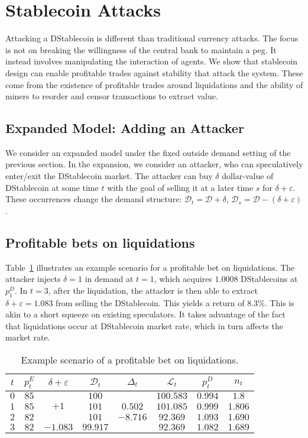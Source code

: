 \section{Stablecoin Attacks}\label{sec:attacks}

Attacking a DStablecoin is different than traditional currency attacks. The focus is not on breaking the willingness of the central bank to maintain a peg. It instead involves manipulating the interaction of agents. We show that stablecoin design can enable profitable trades against stability that attack the system. These come from the existence of profitable trades around liquidations and the ability of miners to reorder and censor transactions to extract value.

\subsection{Expanded Model: Adding an Attacker}

We consider an expanded model under the fixed outside demand setting of the previous section. In the expansion, we consider an attacker, who can speculatively enter/exit the DStablecoin market. The attacker can buy $\delta$ dollar-value of DStablecoin at some time $t$ with the goal of selling it at a later time $s$ for $\delta + \varepsilon$. These occurrences change the demand structure: $\mathcal{D}_t = \mathcal{D} + \delta$, $\mathcal{D}_s = \mathcal{D} - (\delta + \varepsilon)$.






\subsection{Profitable bets on liquidations}

Table~\ref{table:attack} illustrates an example scenario for a profitable bet on liquidations. The attacker injects $\delta = 1$ in demand at $t=1$, which acquires $1.0008$ DStablecoins at $p_1^D$. In $t=3$, after the liquidation, the attacker is then able to extract $\delta +\varepsilon = 1.083$ from selling the DStablecoin. This yields a return of $8.3\%$. This is akin to a short squeeze on existing speculators. It takes advantage of the fact that liquidations occur at DStablecoin market rate, which in turn affects the market rate.
\begin{table}
	\centering
	\begin{tabular}{c|c|c|c|c|c|c|c}
		$t$ & $p_t^E$ & $\delta + \varepsilon$ & $\mathcal{D}_t$ & $\Delta_t$ & $\mathcal{L}_t$ & $p_t^D$ & $n_t$ \\
		\hline
		$0$ & $85$ & & $100$ & & $100.583$ & $0.994$ & $1.8$ \\
		$1$ & $85$ & $+1$ & $101$ & $0.502$ & $101.085$ & $0.999$ & $1.806$ \\
		$2$ & $82$ & & $101$ & $-8.716$ & $92.369$ & $1.093$ & $1.690$ \\
		$3$ & $82$ & $-1.083$ & $99.917$ & & $92.369$ & $1.082$ & $1.689$ \\
	\end{tabular}
	\caption{Example scenario of a profitable bet on liquidations.}\label{table:attack}
\end{table}

